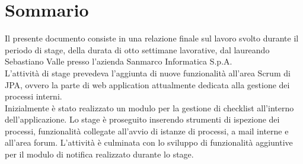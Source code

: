 
\cleardoublepage
{}
{}
\begingroup
\let\clearpage\relax
\let\cleardoublepage\relax
\let\cleardoublepage\relax

\chapter*{Sommario}

Il presente documento consiste in una relazione finale sul lavoro svolto
durante il periodo di stage, della durata di otto settimane lavorative, dal
laureando Sebastiano Valle presso l'azienda Sanmarco Informatica S.p.A. \\

\noindent L'attività di stage prevedeva l'aggiunta di nuove funzionalità all'area Scrum
di JPA, ovvero la parte di web application attualmente dedicata alla gestione
dei processi interni. \\

\noindent Inizialmente è stato realizzato un modulo per la gestione di checklist
all'interno dell'applicazione. Lo stage è proseguito inserendo strumenti di
ispezione dei processi, funzionalità collegate all'avvio di istanze di
processi, a mail interne e all'area forum. L'attività è culminata con lo
sviluppo di funzionalità aggiuntive per il modulo di notifica realizzato
durante lo stage.

%
%

\endgroup			

\vfill

